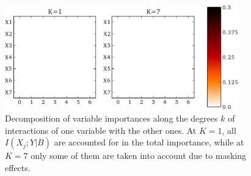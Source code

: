 \begin{figure}
    \centering
    \includegraphics[width=0.9\textwidth]{figures/ch6_imp_led.pdf}
    \caption{Decomposition of variable importances along the degrees $k$ of interactions of one variable with the other ones. At $K=1$, all $I(X_j;Y|B)$ are accounted for in the total importance, while at $K=7$ only some of them are taken into account due to masking effects.}
    \label{fig:decomposition}
\end{figure}


